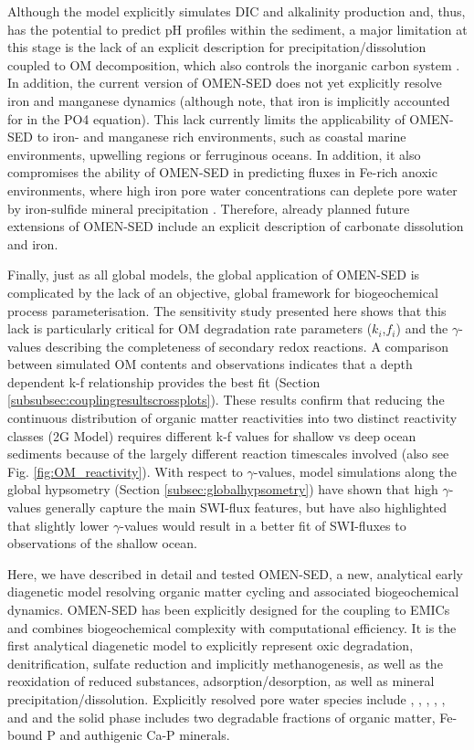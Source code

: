 \documentclass[gmd, manuscript]{copernicus}
\begin{document}
Although the model explicitly simulates DIC and alkalinity production and, thus, has the potential to predict pH profiles within the sediment, a major limitation at this stage is the lack of an explicit description for  
precipitation/dissolution coupled to OM decomposition, which also controls the inorganic carbon system \citep{krumins_dissolved_2013}. In addition, the current version of OMEN-SED does not yet explicitly resolve iron and manganese dynamics
(although note, that iron is implicitly accounted for in the PO4 equation). This lack currently limits the applicability of OMEN-SED to iron- and manganese rich environments, such as coastal marine environments, upwelling regions or 
ferruginous oceans. In addition, it also compromises the ability of OMEN-SED in predicting  fluxes in Fe-rich anoxic environments, where high iron pore water concentrations can deplete pore water  by iron-sulfide mineral 
precipitation \citep[e.g.][]{meyers_production_2007}. Therefore, already planned future extensions of OMEN-SED include an explicit description of carbonate dissolution and iron. 

Finally, just as all global models, the global application of OMEN-SED is complicated by the lack of an objective, global framework for biogeochemical process parameterisation. The sensitivity study presented here shows that this lack is 
particularly critical for OM degradation rate parameters ($k_i$,$f_i$) and the $\gamma$-values describing the completeness of secondary redox reactions. A comparison between simulated OM contents and observations indicates that a depth 
dependent k-f relationship provides the best fit (Section \ref{subsubsec:couplingresultscrossplots}). These results confirm that  reducing the continuous distribution of organic matter reactivities into two distinct reactivity classes (2G Model) 
requires different k-f values for shallow vs deep ocean sediments because of the largely different reaction timescales involved (also see Fig. \ref{fig:OM_reactivity}).
With respect to $\gamma$-values, model simulations along the global hypsometry (Section \ref{subsec:globalhypsometry}) have shown that high $\gamma$-values generally capture 
the main SWI-flux features, but have also highlighted that slightly lower $\gamma$-values would result in a better fit of SWI-fluxes to observations of the shallow ocean. 

\conclusions  %
Here, we have described in detail and tested OMEN-SED, a new, analytical early diagenetic model resolving organic matter cycling and associated biogeochemical dynamics. OMEN-SED has been explicitly designed for the coupling to 
EMICs and combines biogeochemical complexity with computational efficiency. It is the first analytical diagenetic model to explicitly represent oxic degradation, denitrification, sulfate reduction and implicitly methanogenesis, 
as well as the reoxidation of reduced substances, adsorption/desorption, as well as mineral precipitation/dissolution. Explicitly resolved pore water species include , , , , ,  
and  and the solid phase includes two degradable fractions of organic matter, Fe-bound P and authigenic Ca-P minerals.
\end{document}
